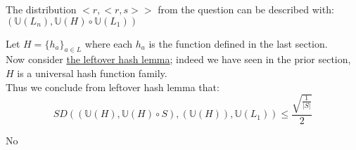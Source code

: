 The distribution $<r,<r,s>>$ from the question
can be described with: $(\mathbb{U}(L_n),\mathbb{U}(H)\circ \mathbb{U}(L_1))$

Let $H=\{h_a\}_{a\in L}$ where each $h_a$ is the function 
defined in the last section.\\
Now consider \href{https://en.wikipedia.org/wiki/Leftover_hash_lemma}
{the leftover hash lemma}; indeed we have seen in the prior section,
$H$ is a universal hash function family.\\
Thus we conclude from leftover hash lemma that:
\[
	SD((\mathbb{U}(H),\mathbb{U}(H)\circ S), (\mathbb{U}(H)), \mathbb{U}(L_1))
	\leq\frac{\sqrt{\frac{1}{|S|}}}{2}
\]

No


